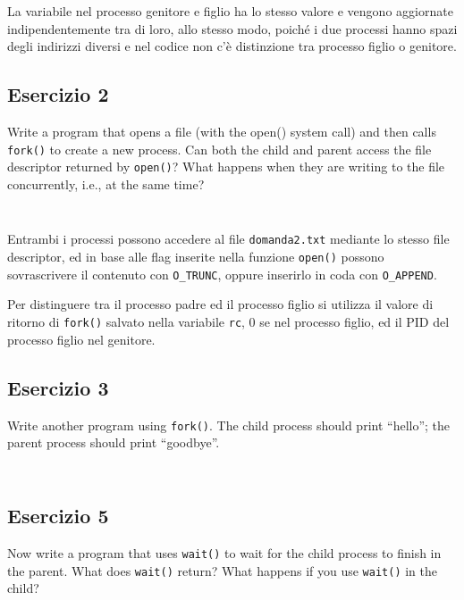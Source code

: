 \documentclass{article}
\numberwithin{equation}{subsection}
\begin{document}
\inputminted[firstline=1,lastline=2]{c}{./"Esercitazione del 29-10-24"/domanda1.c}
\inputminted[firstline=8,lastline=15]{c}{./"Esercitazione del 29-10-24"/domanda1.c}

La variabile nel processo genitore e figlio ha lo stesso valore e vengono aggiornate indipendentemente tra di loro, 
allo stesso modo, poiché i due processi hanno spazi degli indirizzi diversi e nel codice non c'è distinzione 
tra processo figlio o genitore. 

\subsection{Esercizio 2}
Write a program that opens a file (with the open() system call) and then calls \verb|fork()| 
to create a new process. Can both the child and parent access the file descriptor returned 
by \verb|open()|? What happens when they are writing to the file concurrently, i.e., at the 
same time?

\inputminted[firstline=1, lastline=4]{c}{./"Esercitazione del 29-10-24"/domanda2.c}
\inputminted[firstline=13, lastline=26]{c}{./"Esercitazione del 29-10-24"/domanda2.c}

Entrambi i processi possono accedere al file \texttt{domanda2.txt} mediante lo stesso 
file descriptor, ed in base alle flag inserite nella funzione \verb|open()| possono 
sovrascrivere il contenuto con \verb|O_TRUNC|, oppure inserirlo in coda con \verb|O_APPEND|. 

Per distinguere tra il processo padre ed il processo figlio si utilizza il valore di ritorno 
di \verb|fork()| salvato nella variabile \verb|rc|, 0 se nel processo figlio, ed il PID 
del processo figlio nel genitore. 

\subsection{Esercizio 3}
Write another program using \verb|fork()|. The child process should print ``hello''; the parent process should print ``goodbye''.

\inputminted[firstline=1, lastline=4]{c}{./"Esercitazione del 29-10-24"/domanda3.c}
\inputminted[firstline=9, lastline=16]{c}{./"Esercitazione del 29-10-24"/domanda3.c}

\subsection{Esercizio 5}

Now write a program that uses \verb|wait()| to wait for the child process to finish in the parent. What does 
\verb|wait()| return? What happens if you use \verb|wait()| in the child?
\end{document}
